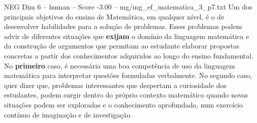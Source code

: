 \begin{textsample}{NEG Dim 6 – human – Score -3.00 – mg/mg\_ef\_matematica\_3\_p7.txt}  \label{ex:f6_neg_006}
Um dos principais objetivos do ensino de Matemática, em qualquer nível, é o de desenvolver habilidades para a solução de problemas.
Esses problemas podem advir de diferentes situações que \textbf{exijam} o domínio da linguagem matemática e da construção de argumentos que permitam ao estudante elaborar propostas concretas a partir dos conhecimentos adquiridos ao longo do ensino fundamental.
No \textbf{primeiro} caso, é necessária uma boa competência de uso da linguagem matemática para interpretar questões formuladas verbalmente.
No segundo caso, quer dizer que, problemas interessantes que despertam a curiosidade dos estudantes, podem surgir dentro do próprio contexto matemático quando novas situações podem ser exploradas e o conhecimento aprofundado, num exercício contínuo de imaginação e de investigação.

\end{textsample}
